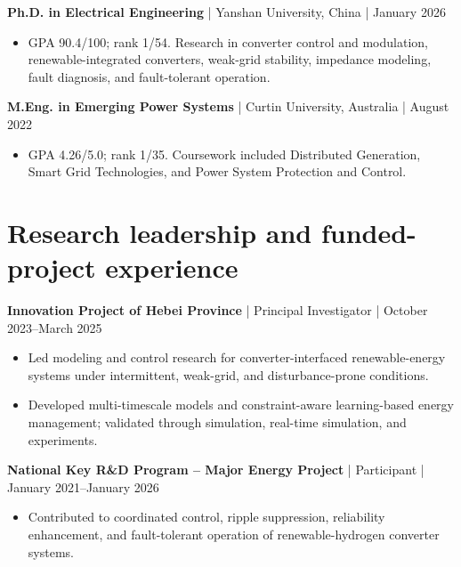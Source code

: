 \documentclass[10pt,a4paper]{article}
\begin{document}
\textbf{Ph.D. in Electrical Engineering} | Yanshan University, China | January 2026\par

\begin{itemize}\item GPA 90.4/100; rank 1/54. Research in converter control and modulation, renewable-integrated converters, weak-grid stability, impedance modeling, fault diagnosis, and fault-tolerant operation.\end{itemize}

\textbf{M.Eng. in Emerging Power Systems} | Curtin University, Australia | August 2022\par

\begin{itemize}\item GPA 4.26/5.0; rank 1/35. Coursework included Distributed Generation, Smart Grid Technologies, and Power System Protection and Control.\end{itemize}

\section*{Research leadership and funded-project experience}

\textbf{Innovation Project of Hebei Province} | Principal Investigator | October 2023–March 2025\par

\begin{itemize}\item Led modeling and control research for converter-interfaced renewable-energy systems under intermittent, weak-grid, and disturbance-prone conditions.\end{itemize}

\begin{itemize}\item Developed multi-timescale models and constraint-aware learning-based energy management; validated through simulation, real-time simulation, and experiments.\end{itemize}

\textbf{National Key R\&D Program – Major Energy Project} | Participant | January 2021–January 2026\par

\begin{itemize}\item Contributed to coordinated control, ripple suppression, reliability enhancement, and fault-tolerant operation of renewable-hydrogen converter systems.\end{itemize}
\end{document}
